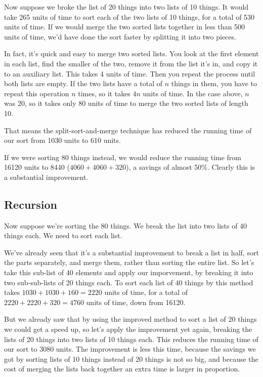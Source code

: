 Now suppose we broke the list of 20 things into two lists of 10 things.
It would take 265 units of time to sort each of the two lists of 10
things, for a total of 530 units of time.  If we would merge the two
sorted lists together in less than 500 units of time, we'd have
done the sort faster by splitting it into two pieces.

In fact, it's quick and easy to merge two sorted lists.  You look at the
first element in each list, find the smaller of the two, remove it from
the list it's in, and copy it to an auxiliary list.  This takes 4 units
of time.  Then you repeat the process until both lists are empty.  If
the two lists have a total of $n$ things in them, you have to repeat
this operation $n$ times, so it takes $4n$ units of time.  In the case
above, $n$ was 20, so it takes only 80 units of time to merge the two
sorted lists of length 10.  

That means the split-sort-and-merge technique has reduced the running
time of our sort from 1030 units to 610 units.  

If we were sorting 80 things instead, we would reduce the running time
from 16120 units to 8440 ($4060+4060+320$), a savings of almost 50\%.
Clearly this is a substantial improvement.

\subsection{Recursion}

Now suppose we're sorting the 80 things.  We break the list into two
lists of 40 things each.  We need to sort each list.

We've already seen that it's a substantial improvement to break a list
in half, sort the parts separately, and merge them, rather than sorting
the entire list.  So let's take this sub-list of 40 elements and apply
our imporvement, by breaking it into two sub-sub-lists of 20 things
each.  To sort each list of 40 things by this method takes
$1030+1030+160 = 2220$ units of time, for a total of $2220+2220+320 =
4760$ units of time, down from 16120.  

But we already saw that by using the improved method to sort a list of
20 things we could get a speed up, so let's apply the improvement yet
again, breaking the lists of 20 things into two lists of 10 things each.
This reduces the running time of our sort to 3080 units.  The
improvement is less this time, because the savings we got by sorting
lists of 10 things instead of 20 things is not so big, and because the
cost of merging the lists back together an extra time is larger in
proportion.  

